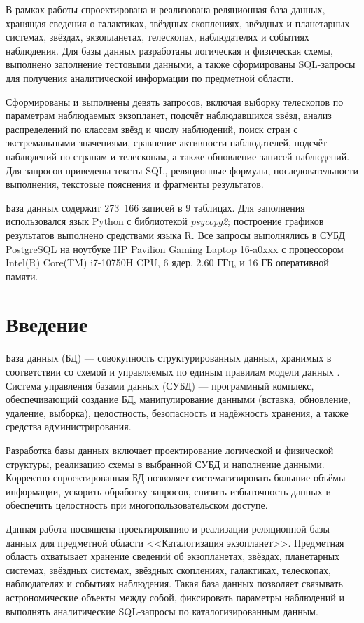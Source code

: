 \documentclass[14pt,a4paper]{extarticle}
\begin{document}
	В рамках работы спроектирована и реализована реляционная база данных, хранящая сведения о галактиках, звёздных скоплениях, звёздных и планетарных системах, звёздах, экзопланетах, телескопах, наблюдателях и событиях наблюдения. Для базы данных разработаны логическая и физическая схемы, выполнено заполнение тестовыми данными, а также сформированы SQL-запросы для получения аналитической информации по предметной области.

	Сформированы и выполнены девять запросов, включая выборку телескопов по параметрам наблюдаемых экзопланет, подсчёт наблюдавшихся звёзд, анализ распределений по классам звёзд и числу наблюдений, поиск стран с экстремальными значениями, сравнение активности наблюдателей, подсчёт наблюдений по странам и телескопам, а также обновление записей наблюдений. Для запросов приведены тексты SQL, реляционные формулы, последовательности выполнения, текстовые пояснения и фрагменты результатов.

	База данных содержит 273~166 записей в 9 таблицах. Для заполнения использовался язык Python с библиотекой \textit{psycopg2}; построение графиков результатов выполнено средствами языка R. Все запросы выполнялись в СУБД PostgreSQL на ноутбуке HP Pavilion Gaming Laptop 16-a0xxx с процессором Intel(R) Core(TM) i7-10750H CPU, 6 ядер, 2.60 ГГц, и 16 ГБ оперативной памяти.
	
	\newpage
	
	\section*{Введение}
	База данных (БД) --- совокупность структурированных данных, хранимых в соответствии со схемой и управляемых по единым правилам модели данных \cite{cows,manga,rel-bd-book}. Система управления базами данных (СУБД) --- программный комплекс, обеспечивающий создание БД, манипулирование данными (вставка, обновление, удаление, выборка), целостность, безопасность и надёжность хранения, а также средства администрирования.
	
	Разработка базы данных включает проектирование логической и физической структуры, реализацию схемы в выбранной СУБД и наполнение данными. Корректно спроектированная БД позволяет систематизировать большие объёмы информации, ускорить обработку запросов, снизить избыточность данных и обеспечить целостность при многопользовательском доступе.
	
	Данная работа посвящена проектированию и реализации реляционной базы данных для предметной области <<Каталогизация экзопланет>>. Предметная область охватывает хранение сведений об экзопланетах, звёздах, планетарных системах, звёздных системах, звёздных скоплениях, галактиках, телескопах, наблюдателях и событиях наблюдения. Такая база данных позволяет связывать астрономические объекты между собой, фиксировать параметры наблюдений и выполнять аналитические SQL-запросы по каталогизированным данным.
	
\end{document}
